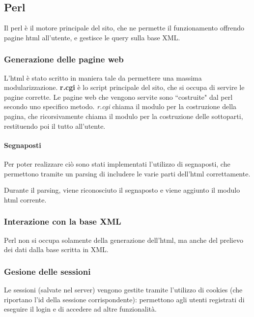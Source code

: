 \subsection{Perl}
Il perl \`e il motore principale del sito, che ne permette il funzionamento offrendo pagine html all'utente, e gestisce le query sulla base XML.
\subsubsection{Generazione delle pagine web}
L'html \`e stato scritto in maniera tale da permettere una massima modularizzazione. \textbf{r.cgi} \`e lo script principale del sito, che si occupa di servire le pagine corrette.
Le pagine web che vengono servite sono ``costruite" dal perl secondo uno specifico metodo. \textit{r.cgi} chiama il modulo per la costruzione della pagina, che ricorsivamente chiama il modulo per la costruzione delle sottoparti, restituendo poi il tutto all'utente.
\paragraph*{Segnaposti} Per poter realizzare ci\`o sono stati implementati l'utilizzo di segnaposti, che permettono tramite un parsing di includere le varie parti dell'html correttamente.

Durante il parsing, viene riconosciuto il segnaposto e viene aggiunto il modulo html corrente.
\subsubsection{Interazione con la base XML}
Perl non si occupa solamente della generazione dell'html, ma anche del prelievo dei dati dalla base scritta in XML.
\subsubsection{Gesione delle sessioni}
Le sessioni (salvate nel server) vengono gestite tramite l'utilizzo di cookies (che riportano l'id della sessione corrispondente): permettono agli utenti registrati di eseguire il login e di accedere ad altre funzionalit\`a.
